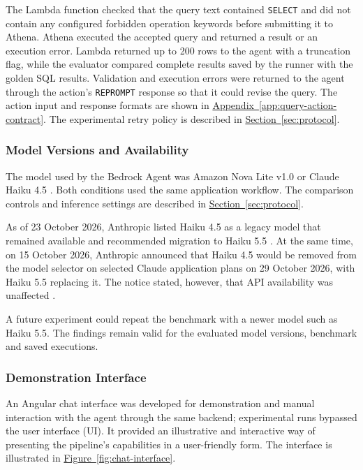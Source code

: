 The Lambda function checked that the query text contained \texttt{SELECT}
and did not contain any configured forbidden operation keywords before
submitting it to Athena. Athena executed the accepted query and returned a result
or an execution error.
Lambda returned up to 200 rows to the agent with a truncation flag, while the
evaluator compared complete results saved by the runner with the golden SQL results.
Validation and execution errors were returned to the
agent through the action's \texttt{REPROMPT} response so that it could revise
the query. 
The action input and response formats are shown in
\hyperref[app:query-action-contract]{Appendix~\ref*{app:query-action-contract}}.
The experimental retry policy is described in
\hyperref[sec:protocol]{Section~\ref*{sec:protocol}}.

\subsubsection{Model Versions and Availability}
\label{sec:model-availability}

The model used by the Bedrock Agent was Amazon Nova Lite v1.0
\citep{awsNovaLite} or Claude Haiku 4.5 \citep{anthropicClaudeHaiku45}. Both conditions used the same application workflow.
The comparison controls and inference settings are described in
\hyperref[sec:protocol]{Section~\ref*{sec:protocol}}.

As of 23 October 2026, Anthropic listed Haiku 4.5 as a legacy model that
remained available and recommended migration to Haiku 5.5
\citep{anthropicClaudeHaiku45}.
At the same time, on 15 October 2026, Anthropic announced that Haiku 4.5 would be removed from
the model selector on selected Claude application plans on 29 October 2026,
with Haiku 5.5 replacing it. The notice stated, however, that API availability was
unaffected \citep{anthropicHaiku45Selector, endoflifeClaude}.

A future experiment could repeat the benchmark with a newer model such as
Haiku 5.5. 
The findings remain valid for the evaluated model versions, benchmark and
saved executions.

\subsubsection{Demonstration Interface}
\label{sec:demonstration-interface}

An Angular \citep{angularOverview} chat interface was developed for demonstration and manual interaction
with the agent through the same backend; experimental runs bypassed the user
interface (UI).
It provided an illustrative and interactive way of presenting the
pipeline's capabilities in a user-friendly form.
The interface is illustrated in \hyperref[fig:chat-interface]{Figure~\ref*{fig:chat-interface}}.

